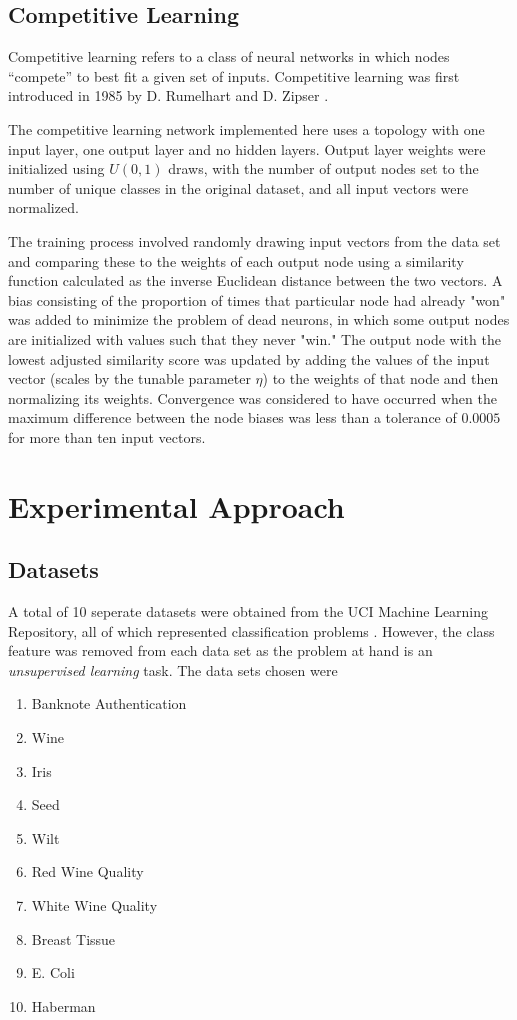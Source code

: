 \documentclass[conference]{IEEEtran}
\begin{document}
  \subsection{Competitive Learning}
  Competitive learning refers to a class of neural networks in which nodes ``compete'' to best fit a given set of inputs. Competitive learning was first introduced in 1985 by D. Rumelhart and D. Zipser \cite{rumelhart}.

  The competitive learning network implemented here uses a topology with one input layer, one output layer and no hidden layers. Output layer weights were initialized using $U(0,1)$ draws, with the number of output nodes set to the number of unique classes in the original dataset, and all input vectors were normalized.

  The training process involved randomly drawing input vectors from the data set and comparing these to the weights of each output node using a similarity function calculated as the inverse Euclidean distance between the two vectors.  A bias consisting of the proportion of times that particular node had already "won" was added to minimize the problem of dead neurons, in which some output nodes are initialized with values such that they never "win."  The output node with the lowest adjusted similarity score was updated by adding the values of the input vector (scales by the tunable parameter $\eta$) to the weights of that node and then normalizing its weights.  Convergence was considered to have occurred when the maximum difference between the node biases was less than a tolerance of $0.0005$ for more than ten input vectors.

\section{Experimental Approach}

\subsection{Datasets}
  A total of 10 seperate datasets were obtained from the UCI Machine Learning Repository, all of which represented classification problems \cite{lichman}. However, the class feature was removed from each data set as the problem at hand is an \textit{unsupervised learning} task. The data sets chosen were
  \begin{enumerate}
  \item Banknote Authentication
  \item Wine
  \item Iris
  \item Seed
  \item Wilt
  \item Red Wine Quality
  \item White Wine Quality
  \item Breast Tissue
  \item E. Coli
  \item Haberman
  \end{enumerate}
\end{document}
